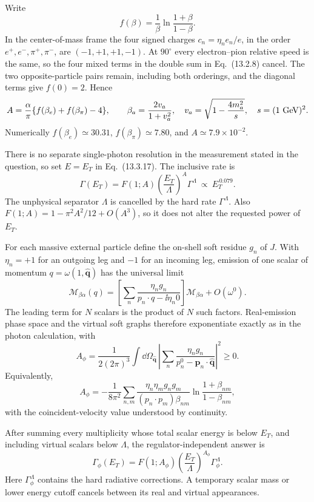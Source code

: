 \ExerciseEditorialNote

\begin{enumerate}
Write
\[
 f(\beta)=\frac1\beta\ln\frac{1+\beta}{1-\beta}.
\]
In the center-of-mass frame the four signed charges
\(c_n=\eta_ne_n/e\), in the order \(e^+,e^-,\pi^+,\pi^-\), are
\((-1,+1,+1,-1)\).  At \(90^\circ\) every electron--pion relative speed is
the same, so the four mixed terms in the double sum in Eq.~(13.2.8)
cancel.  The two opposite-particle pairs remain, including both orderings,
and the diagonal terms give \(f(0)=2\).  Hence
\[
 A=\frac{\alpha}{\pi}\{f(\beta_e)+f(\beta_\pi)-4\},\qquad
 \beta_a=\frac{2v_a}{1+v_a^2},\quad
 v_a=\sqrt{1-\frac{4m_a^2}{s}},
 \quad s=(1\ {\rm GeV})^2 .
\]
Numerically \(f(\beta_e)\simeq30.31\), \(f(\beta_\pi)\simeq7.80\), and
\(A\simeq7.9\times10^{-2}\).

There is no separate single-photon resolution in the measurement stated in
the question, so set \(E=E_T\) in Eq.~(13.3.17).  The inclusive rate is
\[
 \boxed{\quad
 \Gamma(E_T)=F(1;A)\left(\frac{E_T}{\Lambda}\right)^A\Gamma^\Lambda
 \ \propto\ E_T^{\,0.079}.
 \quad}
\]
The unphysical separator \(\Lambda\) is cancelled by the hard rate
\(\Gamma^\Lambda\).  Also \(F(1;A)=1-\pi^2A^2/12+O(A^3)\), so it does not
alter the requested power of \(E_T\).

For each massive external particle define the on-shell soft residue \(g_n\)
of \(J\).  With \(\eta_n=+1\) for an outgoing leg and \(-1\) for an incoming
leg, emission of one scalar of momentum \(q=\omega(1,\widehat{\mathbf q})\)
has the universal limit
\[
 \mathcal M_{\beta\alpha}(q)=
 \left[\sum_n\frac{\eta_ng_n}{p_n\cdot q-\ii\eta_n0}\right]
 \mathcal M_{\beta\alpha}+O(\omega^0).
\]
The leading term for \(N\) scalars is the product of \(N\) such factors.
Real-emission phase space and the virtual soft graphs therefore exponentiate
exactly as in the photon calculation, with
\[
 A_\phi=\frac{1}{2(2\pi)^3}\int \dd\Omega_{\widehat{\mathbf q}}\,
 \left|\sum_n\frac{\eta_ng_n}
 {p_n^0-\mathbf p_n\cdot\widehat{\mathbf q}}\right|^2\geq0.
\]
Equivalently,
\[
 A_\phi=-\frac1{8\pi^2}\sum_{n,m}
 \frac{\eta_n\eta_mg_ng_m}{(p_n\cdot p_m)\beta_{nm}}
 \ln\frac{1+\beta_{nm}}{1-\beta_{nm}},
\]
with the coincident-velocity value understood by continuity.

After summing every multiplicity whose total scalar energy is below \(E_T\),
and including virtual scalars below \(\Lambda\), the regulator-independent
answer is
\[
 \boxed{\quad
 \Gamma_\phi(E_T)=F(1;A_\phi)
 \left(\frac{E_T}{\Lambda}\right)^{A_\phi}\Gamma_\phi^\Lambda .
 \quad}
\]
Here \(\Gamma_\phi^\Lambda\) contains the hard radiative corrections.  A
temporary scalar mass or lower energy cutoff cancels between its real and
virtual appearances.


\end{enumerate}
